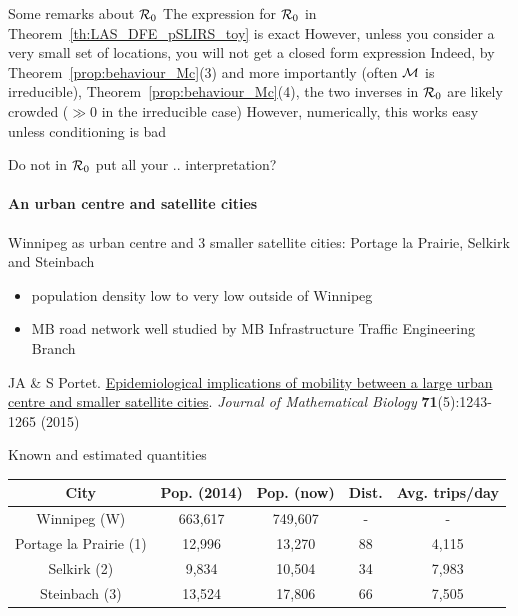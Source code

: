 \documentclass[aspectratio=169]{beamer}\usepackage[]{graphicx}\usepackage[]{xcolor}
\begin{document}
\begin{frame}{Some remarks about $\mathcal{R}_0$}
	The expression for $\mathcal{R}_0$ in Theorem~\ref{th:LAS_DFE_pSLIRS_toy} is exact
	\vfill
	However, unless you consider a very small set of locations, you will not get a closed form expression
	\vfill
	Indeed, by Theorem~\ref{prop:behaviour_Mc}{(3)} and more importantly (often $\mathcal{M}$ is irreducible), Theorem~\ref{prop:behaviour_Mc}{(4)}, the two inverses in $\mathcal{R}_0$ are likely crowded ($\gg 0$ in the irreducible case)
	\vfill
	However, numerically, this works easy unless conditioning is bad
\end{frame}


\begin{frame}{Do not in $\mathcal{R}_0$ put all your .. interpretation?}
\framesubtitle{An urban centre and satellite cities}
Winnipeg as urban centre and 3 smaller satellite cities: Portage la Prairie, Selkirk and Steinbach
\begin{itemize}
	\item population density low to very low outside of Winnipeg
	\item MB road network well studied by MB Infrastructure Traffic Engineering Branch
\end{itemize}
\vfill
JA \& S Portet. \href{https://julien-arino.github.io/assets/pdf/papers/2015_ArinoPortet-JMB71.pdf}{Epidemiological implications of mobility between a large urban centre and smaller satellite cities}. \emph{Journal of Mathematical Biology} \textbf{71}(5):1243-1265 (2015)
\end{frame}


\begin{frame}{Known and estimated quantities}
\begin{center}
	\begin{tabular}{c|c|c|c|c}
		City & Pop. (2014) & Pop. (now) & Dist. & Avg. trips/day \\
		\hline
		Winnipeg (W) & 663,617 & 749,607 & - & - \\
		Portage la Prairie (1) & 12,996 & 13,270 & 88 & 4,115 \\
		Selkirk (2) & 9,834 & 10,504 & 34 & 7,983 \\
		Steinbach (3) & 13,524 & 17,806 & 66 & 7,505
	\end{tabular}
\end{center}
\end{frame}	

\end{document}

